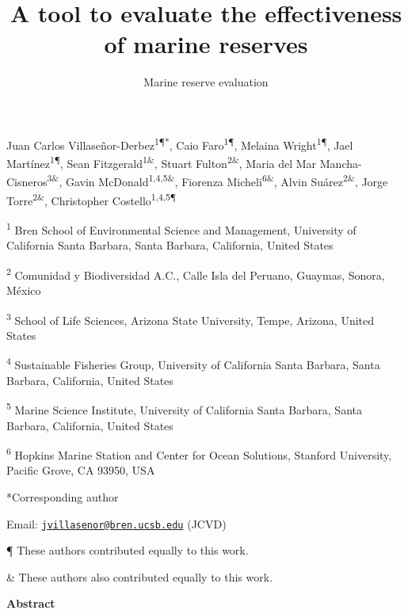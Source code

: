 \documentclass[12pt,]{article}
\title{A \DIFdelbegin \DIFdel{user--friendly }\DIFdelend \DIFaddbegin \DIFadd{user-friendly }\DIFaddend tool to evaluate the effectiveness of \DIFdelbegin \DIFdel{no--take }\DIFdelend \DIFaddbegin \DIFadd{no-take }\DIFaddend marine
reserves}
\subtitle{Marine reserve evaluation}
\author{}
\date{}
\begin{document}
\maketitle

Juan Carlos Villaseñor-Derbez\textsuperscript{1¶*}, Caio
Faro\textsuperscript{1¶}, Melaina Wright\textsuperscript{1¶}, Jael
Martínez\textsuperscript{1¶}, Sean Fitzgerald\textsuperscript{1\&},
Stuart Fulton\textsuperscript{2\&}, Maria del Mar
Mancha-Cisneros\textsuperscript{3\&}, Gavin
McDonald\textsuperscript{1,4,5\&}, Fiorenza
Micheli\textsuperscript{6\&}, Alvin Suárez\textsuperscript{2\&}, Jorge
Torre\textsuperscript{2\&}, Christopher Costello\textsuperscript{1,4,5¶}

\textsuperscript{1} Bren School of Environmental Science and Management,
University of California Santa Barbara, Santa Barbara, California,
United States

\textsuperscript{2} Comunidad y Biodiversidad A.C., Calle Isla del
Peruano, Guaymas, Sonora, México

\textsuperscript{3} School of Life Sciences, Arizona State University,
Tempe, Arizona, United States

\textsuperscript{4} Sustainable Fisheries Group, University of
California Santa Barbara, Santa Barbara, California, United States

\textsuperscript{5} Marine Science Institute, University of California
Santa Barbara, Santa Barbara, California, United States

\textsuperscript{6} Hopkins Marine Station and Center for Ocean
Solutions, Stanford University, Pacific Grove, CA 93950, USA

*Corresponding author

Email:
\href{mailto:jvillasenor@bren.ucsb.edu}{\nolinkurl{jvillasenor@bren.ucsb.edu}}
(JCVD)

¶ These authors contributed equally to this work.

\& These authors also contributed equally to this work.

\clearpage

\textbf{Abstract}
\end{document}
